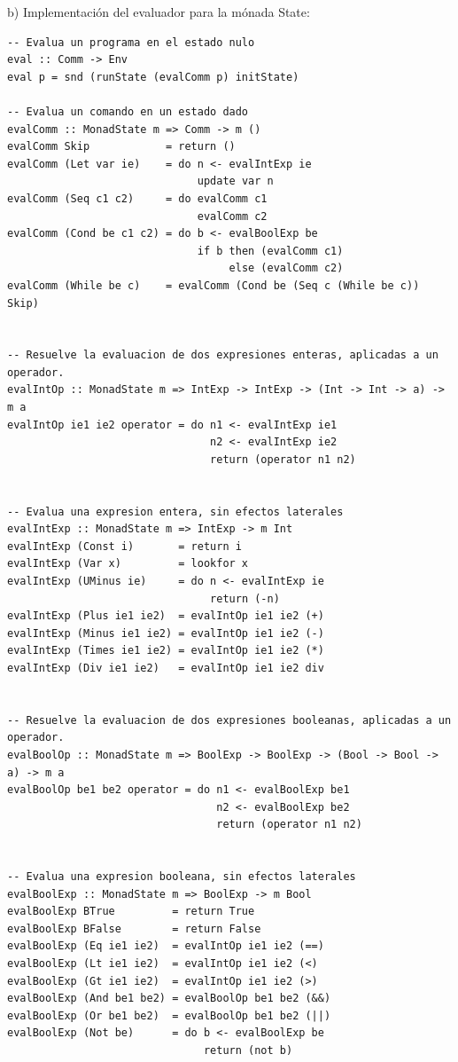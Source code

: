 \documentclass{article}
\begin{document}
\newpage
b) Implementación del evaluador para la mónada State:
\begin{lstlisting}
-- Evalua un programa en el estado nulo
eval :: Comm -> Env
eval p = snd (runState (evalComm p) initState)

-- Evalua un comando en un estado dado
evalComm :: MonadState m => Comm -> m ()
evalComm Skip            = return ()
evalComm (Let var ie)    = do n <- evalIntExp ie 
                              update var n
evalComm (Seq c1 c2)     = do evalComm c1 
                              evalComm c2
evalComm (Cond be c1 c2) = do b <- evalBoolExp be 
                              if b then (evalComm c1)
                                   else (evalComm c2)
evalComm (While be c)    = evalComm (Cond be (Seq c (While be c)) Skip)


-- Resuelve la evaluacion de dos expresiones enteras, aplicadas a un operador.
evalIntOp :: MonadState m => IntExp -> IntExp -> (Int -> Int -> a) -> m a
evalIntOp ie1 ie2 operator = do n1 <- evalIntExp ie1
                                n2 <- evalIntExp ie2
                                return (operator n1 n2)


-- Evalua una expresion entera, sin efectos laterales
evalIntExp :: MonadState m => IntExp -> m Int
evalIntExp (Const i)       = return i
evalIntExp (Var x)         = lookfor x
evalIntExp (UMinus ie)     = do n <- evalIntExp ie 
                                return (-n)
evalIntExp (Plus ie1 ie2)  = evalIntOp ie1 ie2 (+)
evalIntExp (Minus ie1 ie2) = evalIntOp ie1 ie2 (-)
evalIntExp (Times ie1 ie2) = evalIntOp ie1 ie2 (*)
evalIntExp (Div ie1 ie2)   = evalIntOp ie1 ie2 div

                             
-- Resuelve la evaluacion de dos expresiones booleanas, aplicadas a un operador.
evalBoolOp :: MonadState m => BoolExp -> BoolExp -> (Bool -> Bool -> a) -> m a
evalBoolOp be1 be2 operator = do n1 <- evalBoolExp be1
                                 n2 <- evalBoolExp be2
                                 return (operator n1 n2)
                                 
                                 
-- Evalua una expresion booleana, sin efectos laterales
evalBoolExp :: MonadState m => BoolExp -> m Bool
evalBoolExp BTrue         = return True
evalBoolExp BFalse        = return False
evalBoolExp (Eq ie1 ie2)  = evalIntOp ie1 ie2 (==)
evalBoolExp (Lt ie1 ie2)  = evalIntOp ie1 ie2 (<)
evalBoolExp (Gt ie1 ie2)  = evalIntOp ie1 ie2 (>)
evalBoolExp (And be1 be2) = evalBoolOp be1 be2 (&&)
evalBoolExp (Or be1 be2)  = evalBoolOp be1 be2 (||)
evalBoolExp (Not be)      = do b <- evalBoolExp be
                               return (not b)

\end{lstlisting}
\end{document}
